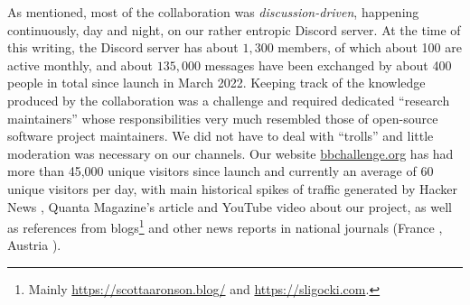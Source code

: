 \documentclass[a4paper,british]{article}
\theoremstyle{definition} %
\numberwithin{equation}{section}
\theoremstyle{definition} %
\newcommand{\CoqBB}{Coq-BB5\xspace}
\begin{document}
As mentioned, most of the collaboration was \textit{discussion-driven}, happening continuously, day and night, on our rather entropic Discord server. At the time of this writing, the Discord server has about $1{,}300$ members, of which about 100 are active monthly, and about $135{,}000$ messages have been exchanged by about 400 people in total since launch in March 2022. Keeping track of the knowledge produced by the collaboration was a challenge and required dedicated ``research maintainers'' whose responsibilities very much resembled those of open-source software project maintainers. We did not have to deal with ``trolls'' and little moderation was necessary on our channels. Our website \href{https://bbchallenge.or}{bbchallenge.org} has had more than 45,000 unique visitors since launch and currently an average of 60 unique visitors per day, with main historical spikes of traffic generated by Hacker News \cite{bmc7505_2023_busybeaver}, Quanta Magazine's article \cite{brubaker2024_bb5_quanta} and YouTube video \cite{quanta2025_busybeaver_video} about our project, as well as references from blogs\footnote{Mainly \url{https://scottaaronson.blog/} and \url{https://sligocki.com}.} and other news reports in national journals (France \cite{larousserie2024_castor}, Austria \cite{derstandard2025_fleissiger_biber}).






\end{document}
